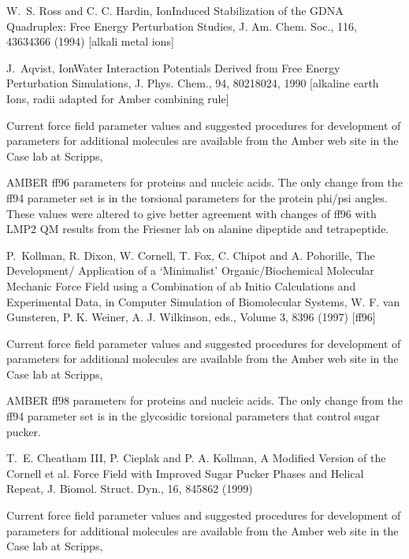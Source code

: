 \documentclass[letterpaper,11pt,english]{sphinxmanual}
\begin{document}
W. S. Ross and C. C. Hardin, Ion\sphinxhyphen{}Induced Stabilization of the G\sphinxhyphen{}DNA Quadruplex: Free Energy Perturbation Studies, J. Am. Chem. Soc., 116, 4363\sphinxhyphen{}4366 (1994)   {[}alkali metal ions{]}

J. Aqvist, Ion\sphinxhyphen{}Water Interaction Potentials Derived from Free Energy Perturbation Simulations, J. Phys. Chem., 94, 8021\sphinxhyphen{}8024, 1990  {[}alkaline earth Ions, radii adapted for Amber combining rule{]}

Current force field parameter values and suggested procedures for development of parameters for additional molecules are available from the Amber web site in the Case lab at Scripps, 


AMBER ff96 parameters for proteins and nucleic acids. The only change from the ff94 parameter set is in the torsional parameters for the protein phi/psi angles. These values were altered to give better agreement with  changes of ff96 with LMP2 QM results from the Friesner lab on alanine dipeptide and tetrapeptide.

P. Kollman, R. Dixon, W. Cornell, T. Fox, C. Chipot and A. Pohorille, The Development/ Application of a ‘Minimalist’ Organic/Biochemical Molecular Mechanic Force Field using a Combination of ab Initio Calculations and Experimental Data, in Computer Simulation of Biomolecular Systems, W. F. van Gunsteren, P. K. Weiner, A. J. Wilkinson, eds., Volume 3, 83\sphinxhyphen{}96 (1997)  {[}ff96{]}

Current force field parameter values and suggested procedures for development of parameters for additional molecules are available from the Amber web site in the Case lab at Scripps, 


AMBER ff98 parameters for proteins and nucleic acids. The only change from the ff94 parameter set is in the glycosidic torsional parameters that control sugar pucker.

T. E. Cheatham III, P. Cieplak and P. A. Kollman, A Modified Version of the Cornell et al. Force Field with Improved Sugar Pucker Phases and Helical Repeat, J. Biomol. Struct. Dyn., 16, 845\sphinxhyphen{}862 (1999)

Current force field parameter values and suggested procedures for development of parameters for additional molecules are available from the Amber web site in the Case lab at Scripps, 
\end{document}
